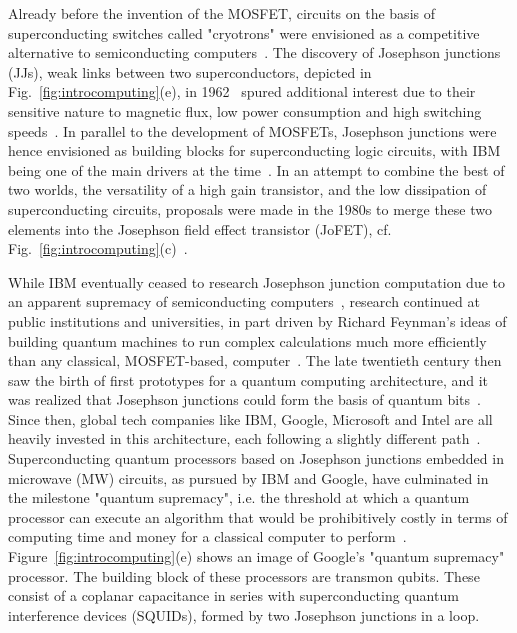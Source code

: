 Already before the invention of the MOSFET, circuits on the basis of superconducting switches called "cryotrons" were envisioned as a competitive alternative to semiconducting computers~\cite{buckCryotronASuperconductiveComputer1956,brockWillNSAFinally}.
%
The discovery of Josephson junctions (JJs), weak links between two superconductors, depicted in Fig.~\ref{fig:introcomputing}(e), in 1962~\cite{josephsonPossibleNewEffects1962,andersonProbableObservationJosephson1963} spured additional interest due to their sensitive nature to magnetic flux, low power consumption and high switching speeds~\cite{mcdonaldPicosecondApplicationsJosephson1980}.
%
In parallel to the development of MOSFETs, Josephson junctions were hence envisioned as building blocks for superconducting logic circuits, with IBM being one of the main drivers at the time~\cite{anackerJosephsonComputerTechnology1980a}.
%
In an attempt to combine the best of two worlds, the versatility of a high gain transistor, and the low dissipation of superconducting circuits, proposals were made in the 1980s to merge these two elements into the Josephson field effect transistor (JoFET), cf. Fig.~\ref{fig:introcomputing}(c)~\cite{clarkFeasibilityHybridJosephson1980,gallagherThreeterminalSuperconductingDevices1985}.


While IBM eventually ceased to research Josephson junction computation due to an apparent supremacy of semiconducting computers~\cite{robinsonIBMDropsSuperconducting1983}, research continued at public institutions and universities, in part driven by Richard Feynman's ideas of building quantum machines to run complex calculations much more efficiently than any classical, MOSFET-based, computer~\cite{feynmanSimulatingPhysicsComputers1982}.
%
The late twentieth century then saw the birth of first prototypes for a quantum computing architecture, and it was realized that Josephson junctions could form the basis of quantum bits~\cite{martinisQuantumJosephsonJunction2020}.
%
Since then, global tech companies like IBM, Google, Microsoft and Intel are all heavily invested in this architecture, each following a slightly different path~\cite{steffenQuantumComputingIBM2011,aruteQuantumSupremacyUsing2019,linnNewMicrosoftBreakthroughs2020,vandersypenQuantumComputingSemiconductor2019}.
%
Superconducting quantum processors based on Josephson junctions embedded in microwave (MW) circuits, as pursued by IBM and Google, have culminated in the milestone "quantum supremacy", i.e. the threshold at which a quantum processor can execute an algorithm that would be prohibitively costly in terms of computing time and money for a classical computer to perform~\cite{aruteQuantumSupremacyUsing2019}.
%
Figure~\ref{fig:introcomputing}(e) shows an image of Google's "quantum supremacy" processor.
%
The building block of these processors are transmon qubits.
%
These consist of a coplanar capacitance in series with superconducting quantum interference devices (SQUIDs), formed by two Josephson junctions in a loop.



